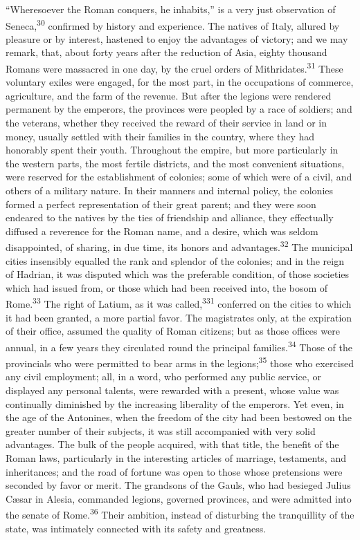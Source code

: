 “Wheresoever the Roman conquers, he inhabits,” is a very just
observation of Seneca,\textsuperscript{30} confirmed by history and experience.
The natives of Italy, allured by pleasure or by interest,
hastened to enjoy the advantages of victory; and we may remark,
that, about forty years after the reduction of Asia, eighty
thousand Romans were massacred in one day, by the cruel orders of
Mithridates.\textsuperscript{31} These voluntary exiles were engaged, for the most
part, in the occupations of commerce, agriculture, and the farm
of the revenue. But after the legions were rendered permanent by
the emperors, the provinces were peopled by a race of soldiers;
and the veterans, whether they received the reward of their
service in land or in money, usually settled with their families
in the country, where they had honorably spent their youth.
Throughout the empire, but more particularly in the western
parts, the most fertile districts, and the most convenient
situations, were reserved for the establishment of colonies; some
of which were of a civil, and others of a military nature. In
their manners and internal policy, the colonies formed a perfect
representation of their great parent; and they were soon endeared
to the natives by the ties of friendship and alliance, they
effectually diffused a reverence for the Roman name, and a
desire, which was seldom disappointed, of sharing, in due time,
its honors and advantages.\textsuperscript{32} The municipal cities insensibly
equalled the rank and splendor of the colonies; and in the reign
of Hadrian, it was disputed which was the preferable condition,
of those societies which had issued from, or those which had been
received into, the bosom of Rome.\textsuperscript{33} The right of Latium, as it
was called,\textsuperscript{331} conferred on the cities to which it had been
granted, a more partial favor. The magistrates only, at the
expiration of their office, assumed the quality of Roman
citizens; but as those offices were annual, in a few years they
circulated round the principal families.\textsuperscript{34} Those of the
provincials who were permitted to bear arms in the legions;\textsuperscript{35}
those who exercised any civil employment; all, in a word, who
performed any public service, or displayed any personal talents,
were rewarded with a present, whose value was continually
diminished by the increasing liberality of the emperors. Yet
even, in the age of the Antonines, when the freedom of the city
had been bestowed on the greater number of their subjects, it was
still accompanied with very solid advantages. The bulk of the
people acquired, with that title, the benefit of the Roman laws,
particularly in the interesting articles of marriage, testaments,
and inheritances; and the road of fortune was open to those whose
pretensions were seconded by favor or merit. The grandsons of the
Gauls, who had besieged Julius Cæsar in Alesia, commanded
legions, governed provinces, and were admitted into the senate of
Rome.\textsuperscript{36} Their ambition, instead of disturbing the tranquillity
of the state, was intimately connected with its safety and
greatness.

